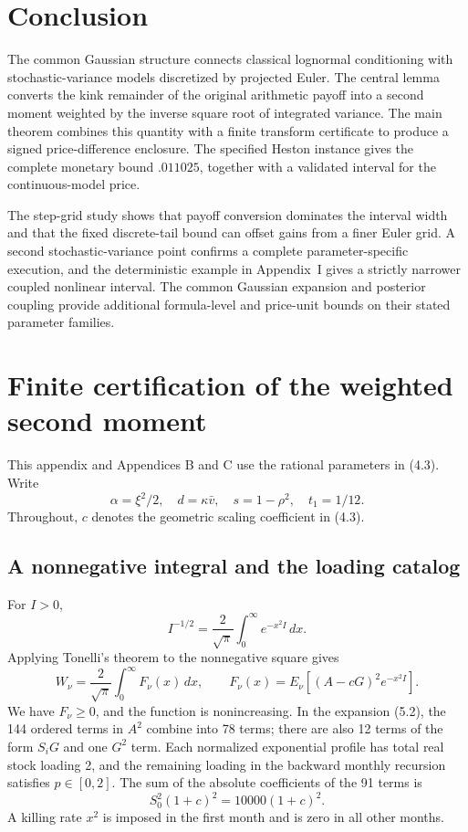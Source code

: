 \section{Conclusion}

The common Gaussian structure connects classical lognormal conditioning with
stochastic-variance models discretized by projected Euler.
The central lemma converts the kink remainder of the original arithmetic payoff into
a second moment weighted by the inverse square root of integrated variance. The main theorem combines this
quantity with a finite transform certificate to produce a signed price-difference enclosure.
The specified Heston instance gives the complete monetary bound \(.011025\), together
with a validated interval for the continuous-model price.

The step-grid study shows that payoff conversion dominates the interval width
and that the fixed discrete-tail bound can offset gains from a finer Euler grid.
A second stochastic-variance point confirms a complete parameter-specific
execution, and the deterministic example in Appendix~I gives a strictly narrower
coupled nonlinear interval. The common Gaussian expansion and posterior coupling provide additional
formula-level and price-unit bounds on their stated parameter families.


\appendix


\section{Finite certification of the weighted second moment}

This appendix and Appendices B and C use the rational parameters in (4.3). Write
\[
\alpha=\xi^2/2,\quad d=\kappa\bar v,\quad
s=1-\rho^2,\quad t_1=1/12.
\]
Throughout, \(c\) denotes the geometric scaling coefficient in (4.3).

\subsection{A nonnegative integral and the loading catalog}

For \(I>0\),
\[
I^{-1/2}=\frac2{\sqrt\pi}\int_0^\infty e^{-x^2I}\,dx.
\]
Applying Tonelli's theorem to the nonnegative square gives
\[
W_\nu=\frac2{\sqrt\pi}\int_0^\infty F_\nu(x)\,dx,\qquad
F_\nu(x)=E_\nu[(A-cG)^2e^{-x^2I}].
\tag{A.1}
\]
We have \(F_\nu\ge0\), and the function is nonincreasing. In the expansion (5.2), the 144 ordered terms in \(A^2\) combine into 78 terms; there are also 12 terms of the form \(S_iG\) and one \(G^2\) term. Each normalized exponential profile has total real stock loading 2, and the remaining loading in the backward monthly recursion satisfies \(p\in[0,2]\). The sum of the absolute coefficients of the 91 terms is
\[
S_0^2(1+c)^2=10000(1+c)^2.
\tag{A.2}
\]
A killing rate \(x^2\) is imposed in the first month and is zero in all other months.

